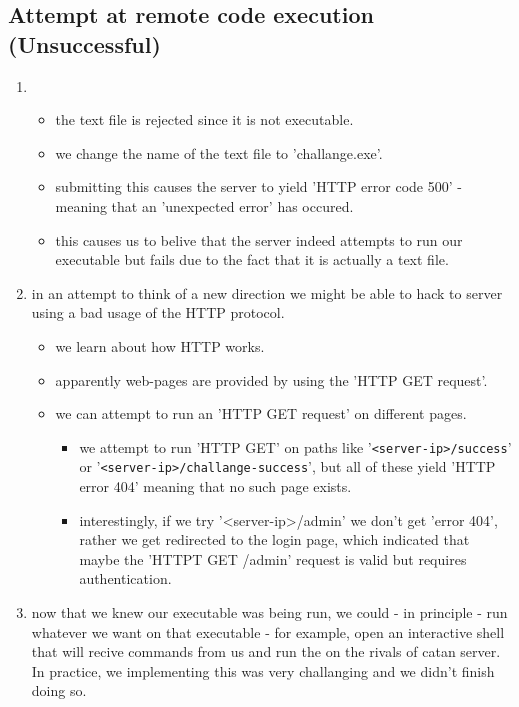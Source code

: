 \documentclass{article}
\begin{document}
\subsection{Attempt at remote code execution (Unsuccessful)}
\begin{enumerate}
	\item \begin{itemize}
		\item the text file is rejected since it is not executable.
		\item we change the name of the text file to 'challange.exe'.
		\item submitting this causes the server to yield 'HTTP error code 500' - meaning that 
			an 'unexpected error' has occured.
		\item this causes us to belive that the server indeed attempts to run our executable but fails due
			to the fact that it is actually a text file.
        \end{itemize}
	\item in an attempt to think of a new direction we might be able to hack to server using a bad usage of the HTTP protocol.
    \begin{itemize}
		\item we learn about how HTTP works.
		\item apparently web-pages are provided by using the 'HTTP GET request'.
		\item we can attempt to run an 'HTTP GET request' on different pages.
        \begin{itemize}
			\item we attempt to run 'HTTP GET' on paths like '\texttt{<server-ip>/success}' or '\texttt{<server-ip>/challange-success}',
				but all of these yield 'HTTP error 404' meaning that no such page exists.
            \item interestingly, if we try '<server-ip>/admin' we don't get 'error 404', rather we get redirected to the login page,
				which indicated that maybe the 'HTTPT GET /admin' request is valid but requires authentication.
        \end{itemize}
    \end{itemize}
	\item now that we knew our executable was being run, we could - in principle - run whatever we want on that executable - for example, open 
		an interactive shell that will recive commands from us and run the on the rivals of catan server.
		In practice, we implementing this was very challanging and we didn't finish doing so.
\end{enumerate}
\end{document}
